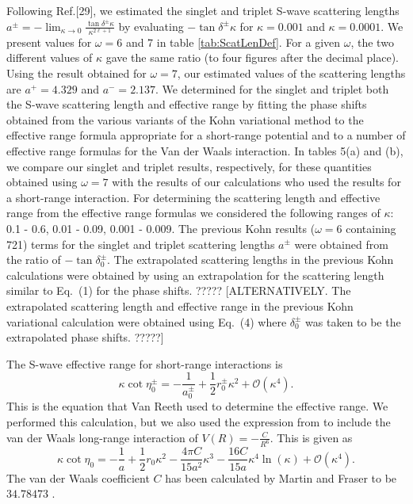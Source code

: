 \documentclass[preprint,showpacs,preprintnumbers,amsmath,amssymb]{revtex4}
\newcommand{\beq}{\begin{equation}}
\newcommand{\eeq}{\end{equation}}
\begin{document}
Following Ref.[29], we estimated the singlet and triplet S-wave scattering lengths
$a^\pm = - \lim_{\kappa \to 0} \frac{\tan \delta^\pm \kappa}{\kappa^{2\ell+1}}$
by evaluating $-\tan \delta^\pm\kappa$ for $\kappa =0.001$ and $\kappa=0.0001$. 
We present values for $\omega=6$ and 7 in table \ref{tab:ScatLenDef}.
For a given $\omega$, the two different values of $\kappa$ gave the same ratio (to four figures after the decimal place).
Using the result obtained for $\omega=7$, our estimated values of the scattering lengths are $a^+ = 4.329$ and $a^- = 2.137$. 
We determined for the singlet and triplet both the S-wave scattering
length and effective range by fitting the phase shifts obtained
from the various variants of the Kohn variational
method to the effective range formula appropriate
for a short-range potential and to a number
of effective range formulas for the Van der Waals interaction.
In tables 5(a) and (b), we compare our singlet and triplet results, respectively,
for these quantities
obtained using $\omega=7$
with the results of our calculations who used the
results for a short-range interaction.
For determining the scattering length and effective range
from the effective range formulas we considered the following
ranges of $\kappa$: 0.1 - 0.6, 0.01 - 0.09, 0.001 - 0.009.
The previous Kohn results ($\omega=6$ containing 721) terms
for the singlet and triplet scattering lengths $a^\pm$ were obtained from
the ratio of $-\tan \delta^\pm_0$.
The extrapolated scattering lengths in the
previous Kohn calculations were obtained by using
an extrapolation for the scattering length similar
to Eq.~(1) for the phase shifts. ?????
[ALTERNATIVELY. The extrapolated scattering length
and effective range in the previous Kohn variational
calculation were obtained using  Eq.~(4) where $\delta^\pm_0$ was
taken to be the extrapolated phase shifts. ?????]

The S-wave effective range for short-range interactions is \cite{}
\beq
\label{eq:EffectiveRangeShort}
\kappa \cot\eta_0^\pm = -\frac{1}{a_0^\pm} + \frac{1}{2} r_0^\pm \kappa^2 + \mathcal{O}(\kappa^4).
\eeq
This is the equation that Van Reeth \cite{}  used to determine the effective range. We performed this calculation, but we also used the expression from \cite{} to include the van der Waals long-range interaction of $V(R) = -\frac{C}{R^6}$. This is given as
\beq
\label{eq:EffectiveRangeLongAu}
\kappa \cot\eta_0 = -\frac{1}{a} + \frac{1}{2} r_0 \kappa^2 - \frac{4 \pi C}{15 a^2} \kappa^3 - \frac{16 C}{15 a} \kappa^4 \ln \left(\kappa \right) + \mathcal{O}(\kappa^4).
\eeq
The van der Waals coefficient $C$ has been calculated by Martin and Fraser to be $34.78473$ \cite{Martin1980}.
\end{document}
